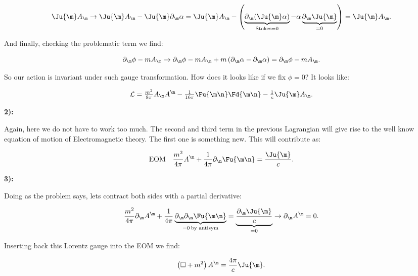 \begin{equation}
	\Ju{\m}\vad{\m} \rightarrow \Ju{\m}\vad{\m} - \Ju{\m}\pd{\m}\alpha = \Ju{\m}\vad{\m} - \left(\underbrace{\pd{\m}(\Ju{\m}\alpha)}_{\text{Stokes} =0} - \alpha\underbrace{\pd{\m}\Ju{\m}}_{=0}\right) = \Ju{\m}\vad{\m}.
\end{equation}

And finally, checking the problematic term we find:

\begin{equation}
	\pd{\m}\phi - m\vad{\m} \rightarrow \pd{\m}\phi - m\vad{\m} + m \left(\pd{\m}\alpha - \pd{\m}\alpha  \right) = \pd{\m}\phi - m\vad{\m}.
\end{equation}

So our action is invariant under such gauge transformation. How does it looks like if we fix $\phi=0$? It looks like:

\begin{equation}
	\mathcal{L} = \tfrac{m^{2}}{8\pi} \vad{\m}\vau{\m} - \tfrac{1}{16\pi} \Fu{\m\n}\Fd{\m\n} - \tfrac{1}{c}\Ju{\m}\vad{\m}.
\end{equation}

\textbf{2):}

Again, here we do not have to work too much. The second and third term in the previous Lagrangian will give rise to the well know equation of motion of Electromagnetic theory. The first one is something new. This will contribute as:

\begin{equation}
	\text{EOM} \quad \frac{m^{2}}{4\pi} \vau{\m} + \frac{1}{4\pi} \pd{\n}\Fu{\m\n} = \frac{\Ju{\m}}{c}. 
\end{equation}

\textbf{3):}

Doing as the problem says, lets contract both sides with a partial derivative:

\begin{equation}
	\frac{m^{2}}{4\pi} \pd{\m}\vau{\m} + \frac{1}{4\pi}\underbrace{\pd{\m}\pd{\n}\Fu{\m\n}}_{=0 \: \text{by antisym}} = \underbrace{\frac{\pd{\m}\Ju{\m}}{c}}_{=0}\rightarrow \pd{\m}\vau{\m} =0.
\end{equation}

Inserting back this Lorentz gauge into the EOM we find:

\begin{equation}\label{eombox}
	\left(\Box + m^{2}\right)\vau{\m} = \frac{4\pi}{c}\Ju{\m}.
\end{equation}

